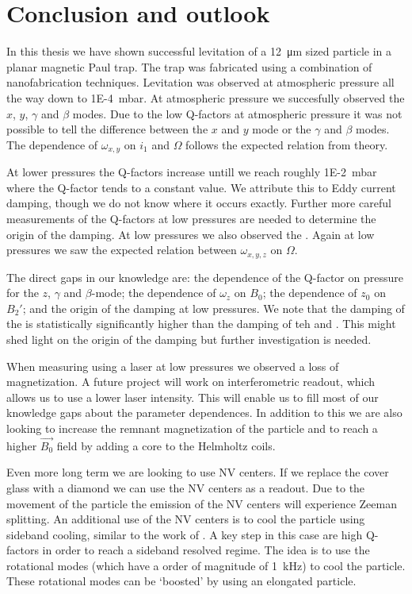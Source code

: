 \chapter{Conclusion and outlook}
\label{chap:conclusion}
In this thesis we have shown successful levitation of a \qty{12}{\micro\meter} sized  particle in a planar magnetic Paul trap. The trap was fabricated using a combination of nanofabrication techniques. Levitation was observed at atmospheric pressure all the way down to \qty{1E-4}{\milli\bar}. At atmospheric pressure we succesfully observed the $x$, $y$, $\gamma$ and $\beta$ modes. Due to the low Q-factors at atmospheric pressure it was not possible to tell the difference between the $x$ and $y$ mode or the $\gamma$ and $\beta$ modes. The dependence of $\omega_{x,y}$ on $i_1$ and $\Omega$ follows the expected relation from theory.

At lower pressures the Q-factors increase untill we reach roughly \qty{1E-2}{\milli\bar} where the Q-factor tends to a constant value. We attribute this to Eddy current damping, though we do not know where it occurs exactly. Further more careful measurements of the Q-factors at low pressures are needed to determine the origin of the damping. At low pressures we also observed the \zmode. Again at low pressures we saw the expected relation between $\omega_{x,y,z}$ on $\Omega$.

The direct gaps in our knowledge are: the dependence of the Q-factor on pressure for the $z$, $\gamma$ and $\beta$-mode; the dependence of $\omega_z$ on $B_0$; the dependence of $z_0$ on $B_2'$; and the origin of the damping at low pressures. We note that the damping of the \zmode is statistically significantly higher than the damping of teh \xmode and \ymode. This might shed light on the origin of the damping but further investigation is needed.

When measuring using a laser at low pressures we observed a loss of magnetization. A future project will work on interferometric readout, which allows us to use a lower laser intensity. This will enable us to fill most of our knowledge gaps about the parameter dependences. In addition to this we are also looking to increase the remnant magnetization of the particle and to reach a higher $\vec{B_0}$ field by adding a core to the Helmholtz coils.

Even more long term we are looking to use NV centers. If we replace the cover glass with a diamond we can use the NV centers as a readout. Due to the movement of the particle the emission of the NV centers will experience Zeeman splitting. An additional use of the NV centers is to cool the particle using sideband cooling, similar to the work of \textcite{delord_spin-cooling_2020}. A key step in this case are high Q-factors in order to reach a sideband resolved regime. The idea is to use the rotational modes (which have a order of magnitude of \qty{1}{\kilo\hertz}) to cool the particle. These rotational modes can be `boosted' by using an elongated particle\cite{huillery_spin-mechanics_2020}.

